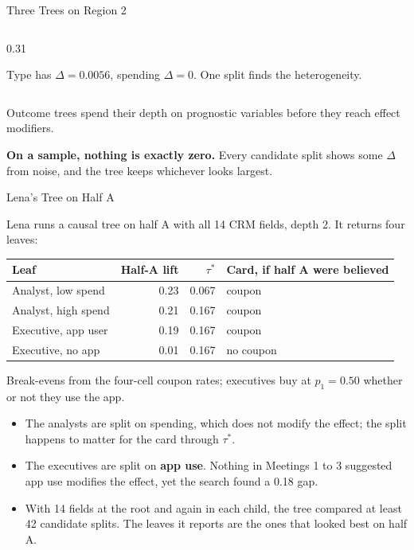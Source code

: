 \documentclass[aspectratio=169, 11pt, handout]{beamer}
\begin{document}
\begin{frame}{Three Trees on Region 2}
\begin{columns}[T]
\begin{column}{0.31\textwidth}
\vspace{0.3em}
\raggedright\footnotesize Type has $\Delta = 0.0056$, spending $\Delta = 0$. One split finds the heterogeneity.
\end{column}
\end{columns}

\bigskip

Outcome trees spend their depth on prognostic variables before they reach effect modifiers.

\smallskip

\textbf{On a sample, nothing is exactly zero.} Every candidate split shows some $\Delta$ from noise, and the tree keeps whichever looks largest.
\end{frame}

\begin{frame}{Lena's Tree on Half A}

Lena runs a causal tree on half A with all 14 CRM fields, depth 2. It returns four leaves:

\begin{center}
\small
\begin{tabular}{lrrl}
\toprule
\textbf{Leaf} & \textbf{Half-A lift} & $\tau^\ast$ & \textbf{Card, if half A were believed} \\
\midrule
Analyst, low spend & 0.23 & 0.067 & coupon \\
Analyst, high spend & 0.21 & 0.167 & coupon \\
Executive, app user & 0.19 & 0.167 & \textcolor{warnred}{coupon} \\
Executive, no app & 0.01 & 0.167 & no coupon \\
\bottomrule
\end{tabular}
\end{center}

\small Break-evens from the four-cell coupon rates; executives buy at $p_1 = 0.50$ whether or not they use the app.

\normalsize
\bigskip

\begin{itemize}
  \item The analysts are split on spending, which does not modify the effect; the split happens to matter for the card through $\tau^\ast$.
  \item The executives are split on \textbf{app use}. Nothing in Meetings 1 to 3 suggested app use modifies the effect, yet the search found a 0.18 gap.
  \item With 14 fields at the root and again in each child, the tree compared at least 42 candidate splits. The leaves it reports are the ones that looked best on half A.
\end{itemize}
\end{frame}
\end{document}
